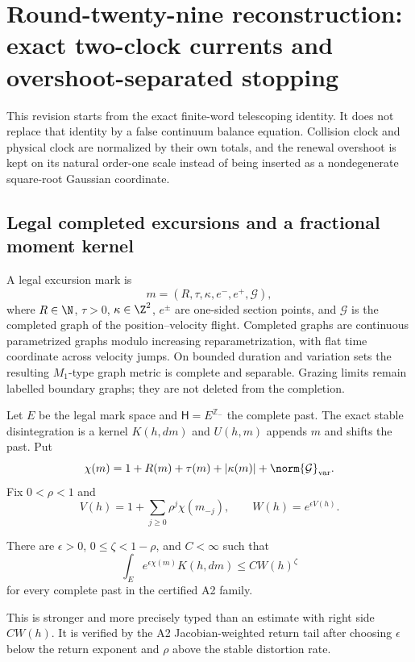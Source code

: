 \section{Round-twenty-nine reconstruction: exact two-clock currents and overshoot-separated stopping}
\label{sec:r29-a3}

This revision starts from the exact finite-word telescoping identity.  It does
not replace that identity by a false continuum balance equation.  Collision
clock and physical clock are normalized by their own totals, and the renewal
overshoot is kept on its natural order-one scale instead of being inserted as
a nondegenerate square-root Gaussian coordinate.

\subsection{Legal completed excursions and a fractional moment kernel}

A legal excursion mark is
\[
 m=(R,\tau,\kappa,e^-,e^+,\mathcal G),                    \tag{A3.1}
\]
where $R\in\N$, $\tau>0$, $\kappa\in\Z^2$, $e^\pm$ are
one-sided section points, and $\mathcal G$ is the completed graph of the
position--velocity flight.  Completed graphs are continuous parametrized
graphs modulo increasing reparametrization, with flat time coordinate across
velocity jumps.  On bounded duration and variation sets the resulting
$M_1$-type graph metric is complete and separable.  Grazing limits remain
labelled boundary graphs; they are not deleted from the completion.

Let $E$ be the legal mark space and $\mathsf H=E^{\mathbb Z_-}$ the complete
past.  The exact stable disintegration is a kernel $K(h,dm)$ and
$U(h,m)$ appends $m$ and shifts the past.  Put
\[
 \chi(m)=1+R(m)+\tau(m)+|\kappa(m)|+
\norm{\mathcal G}_{{\rm var}}.
\]
Fix $0<\rho<1$ and
\[
 V(h)=1+\sum_{j\ge0}\rho^j\chi(m_{-j}),\qquad W(h)=e^{\epsilon V(h)}.
                                                                    \tag{A3.2}
\]

\begin{assumption}
\label{ass:r29-a3-fractional}
There are $\epsilon>0$, $0\le\zeta<1-\rho$, and $C<\infty$ such that
\[
 \int_Ee^{\epsilon\chi(m)}K(h,dm)\le C W(h)^\zeta          \tag{A3.3}
\]
for every complete past in the certified A2 family.
\end{assumption}

This is stronger and more precisely typed than an estimate with right side
$CW(h)$.  It is verified by the A2 Jacobian-weighted return tail after choosing
$\epsilon$ below the return exponent and $\rho$ above the stable distortion
rate.

